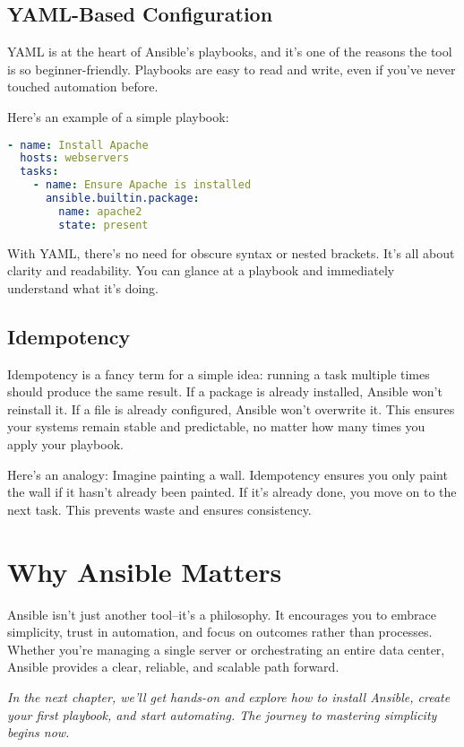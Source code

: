 \subsection{YAML-Based Configuration}

YAML is at the heart of Ansible's playbooks, and it's one of the reasons the tool is so beginner-friendly. Playbooks are easy to read and write, even if you've never touched automation before.

Here's an example of a simple playbook:
\begin{lstlisting}[language=yaml, caption=Example Playbook: Installing Apache]
- name: Install Apache
  hosts: webservers
  tasks:
    - name: Ensure Apache is installed
      ansible.builtin.package:
        name: apache2
        state: present
\end{lstlisting}

With YAML, there's no need for obscure syntax or nested brackets. It's all about clarity and readability. You can glance at a playbook and immediately understand what it's doing.

\subsection{Idempotency}

Idempotency is a fancy term for a simple idea: running a task multiple times should produce the same result. If a package is already installed, Ansible won't reinstall it. If a file is already configured, Ansible won't overwrite it. This ensures your systems remain stable and predictable, no matter how many times you apply your playbook.

Here's an analogy: Imagine painting a wall. Idempotency ensures you only paint the wall if it hasn't already been painted. If it's already done, you move on to the next task. This prevents waste and ensures consistency.

\section{Why Ansible Matters}

Ansible isn't just another tool--it's a philosophy. It encourages you to embrace simplicity, trust in automation, and focus on outcomes rather than processes. Whether you're managing a single server or orchestrating an entire data center, Ansible provides a clear, reliable, and scalable path forward.

\vspace{1em}

\textit{In the next chapter, we'll get hands-on and explore how to install Ansible, create your first playbook, and start automating. The journey to mastering simplicity begins now.}
